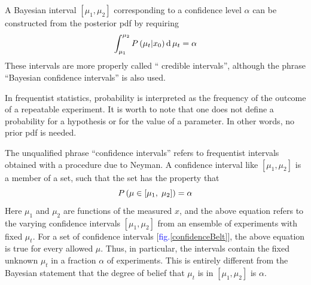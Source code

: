 \documentclass[a4paper,12pt]{article}
\begin{document}
A Bayesian interval $[\mu_1, \mu_2]$ corresponding to a confidence level $\alpha$ can be constructed from the posterior pdf by requiring
\begin{equation}
\large
    \int_{\mu_1}^{\mu_2}P\left(\mu_t\vert x_0\right)\operatorname d\mu_t=\alpha
\end{equation}
These intervals are more properly called “ credible intervals”, although the phrase “Bayesian confidence intervals” is also used.

In frequentist statistics, probability is interpreted as the frequency of the outcome of a repeatable experiment. It is worth to note that one does not define a probability for a hypothesis or for the value of a parameter. In other words, no prior pdf is needed.

The unqualified phrase “confidence intervals” refers to frequentist intervals obtained with a procedure due to Neyman. A confidence interval like $[\mu_1, \mu_2]$ is a member of a set, such that the set has the property that
\begin{equation}
\large
    P\left(\mu\in\left[\mu_1,\;\mu_2\right]\right)=\alpha
\end{equation}
Here $\mu_1$ and $\mu_2$ are functions of the measured $x$, and the above equation refers to the varying confidence intervals $[\mu_1, \mu_2]$ from an ensemble of experiments with fixed $\mu_t$. For a set of confidence 
intervals [\textcolor{blue}{fig.\ref{confidenceBelt}}], the above equation is true for every allowed $\mu$. Thus, in particular, the intervals contain the fixed unknown $\mu_t$ in a fraction $\alpha$ of experiments. This is entirely different from the Bayesian
statement that the degree of belief that $\mu_t$ is in $[\mu_1, \mu_2]$ is $\alpha$.
\end{document}

